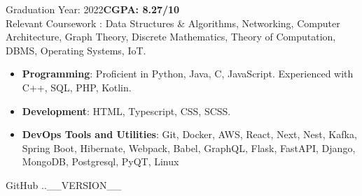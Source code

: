 \documentclass[10pt,a4paper,ragged2e]{classes/altacv}
\begin{document}

Graduation Year: 2022\hspace{5mm}\textbf{CGPA: 8.27/10 }\\
\smallskip
Relevant Coursework : Data Structures \& Algorithms, Networking, Computer Architecture, Graph Theory, Discrete Mathematics, Theory of Computation, DBMS, Operating Systems, IoT.



\smallskip
\begin{itemize}
\item \textbf{Programming}: Proficient in Python, Java, C, JavaScript. Experienced with C++, SQL, PHP, Kotlin.
\smallskip
\item \textbf{Development}: HTML, Typescript, CSS, SCSS.
\smallskip
\item \textbf{DevOps Tools and Utilities}: Git, Docker, AWS, React, Next, Nest, Kafka, Spring Boot, Hibernate, Webpack, Babel, GraphQL, Flask, FastAPI, Django, MongoDB, Postgresql, PyQT, Linux  
\smallskip
\end{itemize}

\smallskip
\begin{footnotesize}
GitHub \number \month .\number\year.__VERSION__
\end{footnotesize}
\clearpage
\end{document}
